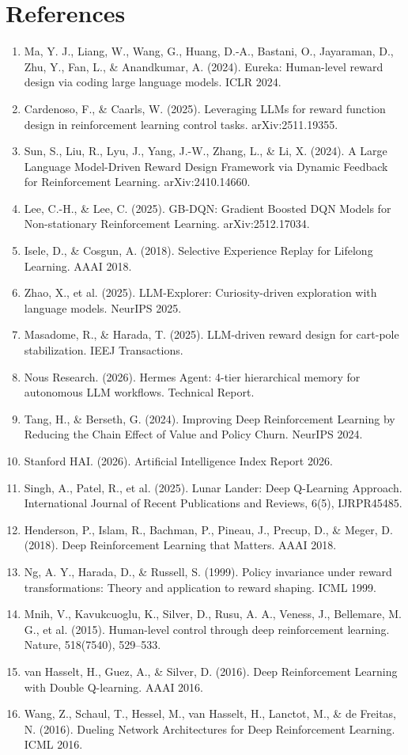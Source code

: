 \documentclass[conference,letterpaper,10pt]{IEEEtran}
\providecommand{\tightlist}{\setlength{\itemsep}{0pt}\setlength{\parskip}{0pt}}
\begin{document}
\section*{References}

\begin{enumerate}
\def\labelenumi{[\arabic{enumi}]}
\tightlist
\item
  Ma, Y. J., Liang, W., Wang, G., Huang, D.-A., Bastani, O., Jayaraman, D., Zhu, Y., Fan, L., \& Anandkumar, A. (2024). Eureka: Human-level reward design via coding large language models. ICLR 2024.
\item
  Cardenoso, F., \& Caarls, W. (2025). Leveraging LLMs for reward function design in reinforcement learning control tasks. arXiv:2511.19355.
\item
  Sun, S., Liu, R., Lyu, J., Yang, J.-W., Zhang, L., \& Li, X. (2024). A Large Language Model-Driven Reward Design Framework via Dynamic Feedback for Reinforcement Learning. arXiv:2410.14660.
\item
  Lee, C.-H., \& Lee, C. (2025). GB-DQN: Gradient Boosted DQN Models for Non-stationary Reinforcement Learning. arXiv:2512.17034.
\item
  Isele, D., \& Cosgun, A. (2018). Selective Experience Replay for Lifelong Learning. AAAI 2018.
\item
  Zhao, X., et al. (2025). LLM-Explorer: Curiosity-driven exploration with language models. NeurIPS 2025.
\item
  Masadome, R., \& Harada, T. (2025). LLM-driven reward design for cart-pole stabilization. IEEJ Transactions.
\item
  Nous Research. (2026). Hermes Agent: 4-tier hierarchical memory for autonomous LLM workflows. Technical Report.
\item
  Tang, H., \& Berseth, G. (2024). Improving Deep Reinforcement Learning by Reducing the Chain Effect of Value and Policy Churn. NeurIPS 2024.
\item
  Stanford HAI. (2026). Artificial Intelligence Index Report 2026.
\item
  Singh, A., Patel, R., et al. (2025). Lunar Lander: Deep Q-Learning Approach. International Journal of Recent Publications and Reviews, 6(5), IJRPR45485.
\item
  Henderson, P., Islam, R., Bachman, P., Pineau, J., Precup, D., \& Meger, D. (2018). Deep Reinforcement Learning that Matters. AAAI 2018.
\item
  Ng, A. Y., Harada, D., \& Russell, S. (1999). Policy invariance under reward transformations: Theory and application to reward shaping. ICML 1999.
\item
  Mnih, V., Kavukcuoglu, K., Silver, D., Rusu, A. A., Veness, J., Bellemare, M. G., et al. (2015). Human-level control through deep reinforcement learning. Nature, 518(7540), 529--533.
\item
  van Hasselt, H., Guez, A., \& Silver, D. (2016). Deep Reinforcement Learning with Double Q-learning. AAAI 2016.
\item
  Wang, Z., Schaul, T., Hessel, M., van Hasselt, H., Lanctot, M., \& de Freitas, N. (2016). Dueling Network Architectures for Deep Reinforcement Learning. ICML 2016.
\end{enumerate}
\end{document}
